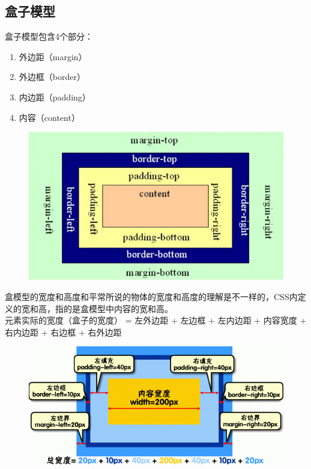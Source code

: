 \subsection{盒子模型}

盒子模型包含4个部分：

\begin{enumerate}
	\item 外边距（margin）
	\item 外边框（border）
	\item 内边距（padding）
	\item 内容（content）
\end{enumerate}

\begin{figure}[H]
	\centering
	\includegraphics[scale=0.7]{img/C8/8-2/1.png}
\end{figure}

盒模型的宽度和高度和平常所说的物体的宽度和高度的理解是不一样的，CSS内定义的宽和高，指的是盒模型中内容的宽和高。 \\

元素实际的宽度（盒子的宽度） = 左外边距 + 左边框 + 左内边距 + 内容宽度 + 右内边距 + 右边框 + 右外边距 \\

\begin{figure}[H]
	\centering
	\includegraphics[]{img/C8/8-2/2.png}
\end{figure}

